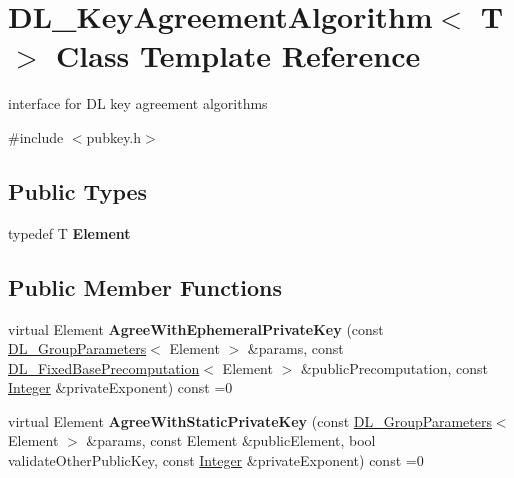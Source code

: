 \hypertarget{class_d_l___key_agreement_algorithm}{
\section{DL\_\-KeyAgreementAlgorithm$<$ T $>$ Class Template Reference}
\label{class_d_l___key_agreement_algorithm}
}


interface for DL key agreement algorithms  


{\ttfamily \#include $<$pubkey.h$>$}\subsection*{Public Types}
\begin{DoxyCompactItemize}
\item 
\hypertarget{class_d_l___key_agreement_algorithm_a4ab1849239df6ab38052e90d27e6ceff}{
typedef T {\bfseries Element}}
\label{class_d_l___key_agreement_algorithm_a4ab1849239df6ab38052e90d27e6ceff}

\end{DoxyCompactItemize}
\subsection*{Public Member Functions}
\begin{DoxyCompactItemize}
\item 
\hypertarget{class_d_l___key_agreement_algorithm_accd4c9f83c2338603eb72861113dc87f}{
virtual Element {\bfseries AgreeWithEphemeralPrivateKey} (const \hyperlink{class_d_l___group_parameters}{DL\_\-GroupParameters}$<$ Element $>$ \&params, const \hyperlink{class_d_l___fixed_base_precomputation}{DL\_\-FixedBasePrecomputation}$<$ Element $>$ \&publicPrecomputation, const \hyperlink{class_integer}{Integer} \&privateExponent) const =0}
\label{class_d_l___key_agreement_algorithm_accd4c9f83c2338603eb72861113dc87f}

\item 
\hypertarget{class_d_l___key_agreement_algorithm_a2b7e5bae4ebd995e76bd6d7f8f045ae3}{
virtual Element {\bfseries AgreeWithStaticPrivateKey} (const \hyperlink{class_d_l___group_parameters}{DL\_\-GroupParameters}$<$ Element $>$ \&params, const Element \&publicElement, bool validateOtherPublicKey, const \hyperlink{class_integer}{Integer} \&privateExponent) const =0}
\label{class_d_l___key_agreement_algorithm_a2b7e5bae4ebd995e76bd6d7f8f045ae3}

\end{DoxyCompactItemize}


